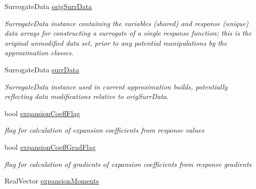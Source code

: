\begin{DoxyCompactItemize}
\item 
Surrogate\+Data \hyperlink{classPecos_1_1PolynomialApproximation_adea5235bed42287989f0bf6821f9bcf0}{orig\+Surr\+Data}\label{classPecos_1_1PolynomialApproximation_adea5235bed42287989f0bf6821f9bcf0}

\begin{DoxyCompactList}\small\item\em Surrogate\+Data instance containing the variables (shared) and response (unique) data arrays for constructing a surrogate of a single response function; this is the original unmodified data set, prior to any potential manipulations by the approximation classes. \end{DoxyCompactList}\item 
Surrogate\+Data \hyperlink{classPecos_1_1PolynomialApproximation_a8e8d62a29dcb5dd55fd03bef1a2b3ea6}{surr\+Data}\label{classPecos_1_1PolynomialApproximation_a8e8d62a29dcb5dd55fd03bef1a2b3ea6}

\begin{DoxyCompactList}\small\item\em Surrogate\+Data instance used in current approximation builds, potentially reflecting data modifications relative to orig\+Surr\+Data. \end{DoxyCompactList}\item 
bool \hyperlink{classPecos_1_1PolynomialApproximation_a2360afb8f64a97ee47b06f6f5bc26618}{expansion\+Coeff\+Flag}\label{classPecos_1_1PolynomialApproximation_a2360afb8f64a97ee47b06f6f5bc26618}

\begin{DoxyCompactList}\small\item\em flag for calculation of expansion coefficients from response values \end{DoxyCompactList}\item 
bool \hyperlink{classPecos_1_1PolynomialApproximation_af9a1bf1104405cef21ee2fb1c8d61594}{expansion\+Coeff\+Grad\+Flag}\label{classPecos_1_1PolynomialApproximation_af9a1bf1104405cef21ee2fb1c8d61594}

\begin{DoxyCompactList}\small\item\em flag for calculation of gradients of expansion coefficients from response gradients \end{DoxyCompactList}\item 
Real\+Vector \hyperlink{classPecos_1_1PolynomialApproximation_a5276542d5b32abfc1ea217fcb7c18a1b}{expansion\+Moments}\label{classPecos_1_1PolynomialApproximation_a5276542d5b32abfc1ea217fcb7c18a1b}


\end{DoxyCompactItemize}
